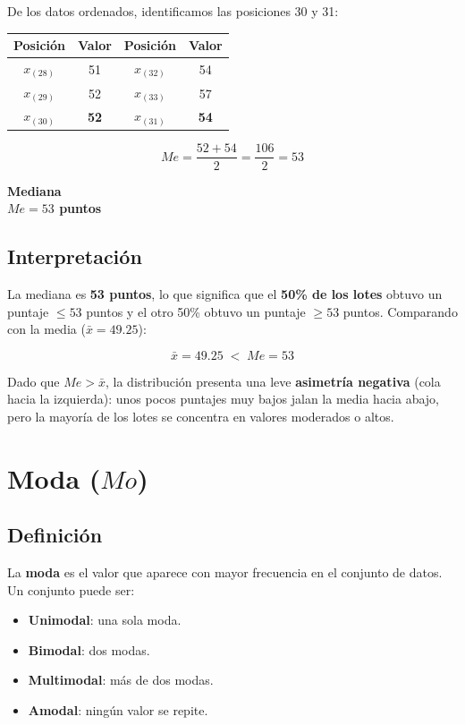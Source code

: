 \documentclass[12pt,a4paper]{article}
\newcommand{\cajaresultado}[2]{%
  \begin{center}
    \colorbox{cremoso}{%
      \parbox{0.85\textwidth}{%
        \vspace{4pt}
        \centering
        \textbf{\textcolor{cafeoscuro}{#1}} \\[4pt]
        \Large\textcolor{cafemedio}{\textbf{#2}}
        \vspace{4pt}
      }
    }
  \end{center}
}
\begin{document}
De los datos ordenados, identificamos las posiciones 30 y 31:

\begin{center}
\begin{tabular}{cccc}
\toprule
\textbf{Posición} & \textbf{Valor} & \textbf{Posición} & \textbf{Valor} \\
\midrule
$x_{(28)}$ & 51 & $x_{(32)}$ & 54 \\
$x_{(29)}$ & 52 & $x_{(33)}$ & 57 \\
\rowcolor{cafesuave}
$x_{(30)}$ & \textbf{52} & $x_{(31)}$ & \textbf{54} \\
\bottomrule
\end{tabular}
\end{center}

\[
Me = \frac{52 + 54}{2} = \frac{106}{2} = 53
\]

\cajaresultado{Mediana}{\(Me = 53\) puntos}

\subsection{Interpretación}

La mediana es \textbf{53 puntos}, lo que significa que el \textbf{50\% de los lotes} obtuvo un puntaje $\leq 53$ puntos y el otro 50\% obtuvo un puntaje $\geq 53$ puntos. Comparando con la media ($\bar{x} = 49.25$):

\[
\bar{x} = 49.25 \;<\; Me = 53
\]

Dado que $Me > \bar{x}$, la distribución presenta una leve \textbf{asimetría negativa} (cola hacia la izquierda): unos pocos puntajes muy bajos jalan la media hacia abajo, pero la mayoría de los lotes se concentra en valores moderados o altos.

\section{Moda (\(Mo\))}

\subsection{Definición}

La \textbf{moda} es el valor que aparece con mayor frecuencia en el conjunto de datos. Un conjunto puede ser:
\begin{itemize}[leftmargin=2cm]
  \item \textbf{Unimodal}: una sola moda.
  \item \textbf{Bimodal}: dos modas.
  \item \textbf{Multimodal}: más de dos modas.
  \item \textbf{Amodal}: ningún valor se repite.
\end{itemize}
\end{document}
